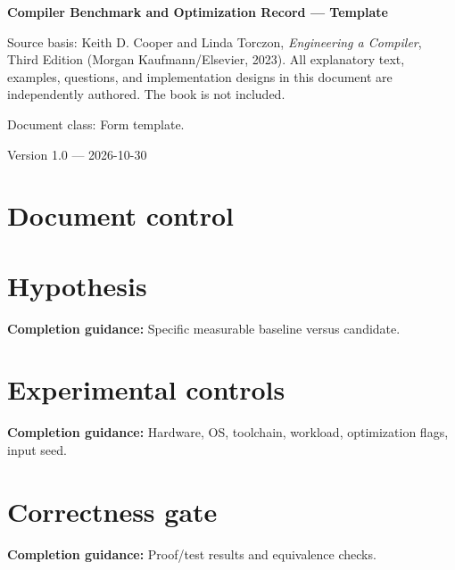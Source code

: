 \documentclass[10pt,letterpaper]{article}
\begin{document}
\hypersetup{pageanchor=false}%
\begin{titlepage}
\centering\vspace*{1.0in}
{\Huge\bfseries\textcolor{CompilerBlue}{Compiler Benchmark and Optimization Record --- Template}\par}
\vspace{.22in}{\Large Authoring form and printable record\par}
\vspace{.4in}{\large Compiler Engineering Documentation Suite\par}
\vfill
\begin{minipage}{.86\linewidth}\small
Source basis: Keith D. Cooper and Linda Torczon, \emph{Engineering a Compiler}, Third Edition (Morgan Kaufmann/Elsevier, 2023). All explanatory text, examples, questions, and implementation designs in this document are independently authored. The book is not included.\par\medskip
Document class: Form template.
\end{minipage}
\vfill\textcolor{CompilerGray}{Version 1.0 --- 2026-10-30}\par
\end{titlepage}\hypersetup{pageanchor=true}
\tableofcontents\clearpage
\section{Document control}
\section{Hypothesis}
\textbf{Completion guidance:} Specific measurable baseline versus candidate.\par\medskip{}
\section{Experimental controls}
\textbf{Completion guidance:} Hardware, OS, toolchain, workload, optimization flags, input seed.\par\medskip{}
\section{Correctness gate}
\textbf{Completion guidance:} Proof/test results and equivalence checks.\par\medskip{}
\end{document}
